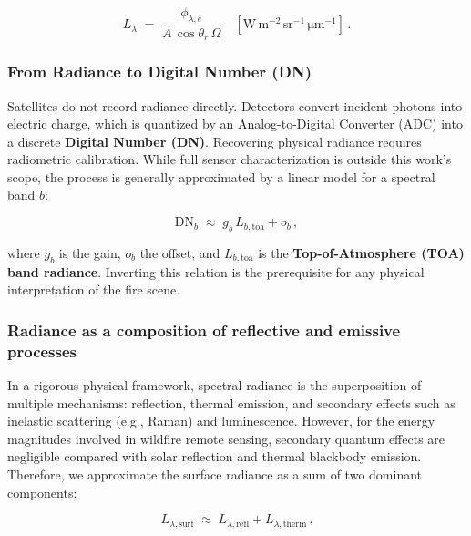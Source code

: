 \begin{table}[ht]
{\begin{equation}

L_{\lambda} \;=\; \frac{\phi_{\lambda,e}}{A\,\cos\theta_r\,\Omega}\quad [\mathrm{W\,m^{-2}\,sr^{-1}\,\mu m^{-1}}] \,.

\end{equation}



\subsubsection{From Radiance to Digital Number (DN)}

Satellites do not record radiance directly. Detectors convert incident photons into electric charge, which is quantized by an Analog-to-Digital Converter (ADC) into a discrete \textbf{Digital Number (DN)}. Recovering physical radiance requires radiometric calibration. While full sensor characterization is outside this work's scope, the process is generally approximated by a linear model for a spectral band $b$:

\begin{equation}

\mathrm{DN}_b \;\approx\; g_b\,L_{b,\mathrm{toa}} + o_b\,,

\end{equation}

where $g_b$ is the gain, $o_b$ the offset, and $L_{b,\mathrm{toa}}$ is the \textbf{Top-of-Atmosphere (TOA) band radiance}. Inverting this relation is the prerequisite for any physical interpretation of the fire scene.



\subsubsection{Radiance as a composition of reflective and emissive processes}

In a rigorous physical framework, spectral radiance is the superposition of multiple mechanisms: reflection, thermal emission, and secondary effects such as inelastic scattering (e.g., Raman) and luminescence. However, for the energy magnitudes involved in wildfire remote sensing, secondary quantum effects are negligible compared with solar reflection and thermal blackbody emission. Therefore, we approximate the surface radiance as a sum of two dominant components:

\begin{equation}

L_{\lambda,\mathrm{surf}} \;\approx\; L_{\lambda,\mathrm{refl}} + L_{\lambda,\mathrm{therm}}\,.


\end{equation}}
\end{table}
